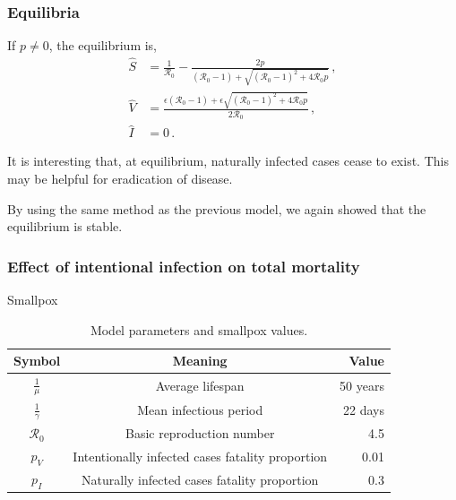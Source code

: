\documentclass[12pt]{beamer}
\newcommand{\R}{\mathcal{R}}
\newcommand{\pmV}{p_{V}}
\newcommand{\pmI}{p_{I}}
\begin{document}
\begin{frame}
\frametitle{Equilibria}

If $p\neq 0$, the equilibrium is,
\begin{subequations}
\begin{align}
\hat{S}&= \frac{1}{\R_0}-\frac{2p}{(\R_0 -1)+ \sqrt{(\R_0-1)^2+4\R_0
         p}}\,, \label{eq:Shat}\\
\hat{V}&= \frac{\epsilon(\R_0 -1)+ \epsilon \sqrt{(\R_0-1)^2+4\R_0 p}}{2\R_0}\,, \label{eq:Vhat}\\
\hat{I}&=0\,. \label{eq:Ihat}
\end{align}
\end{subequations}

It is interesting that, at equilibrium, naturally infected cases cease to exist. This may be helpful for eradication of disease.
\end{frame}
\begin{frame}
By using the same method as the previous model, we again showed that the equilibrium is stable. 
\end{frame}
\begin{frame}
\frametitle{Effect of intentional infection on total mortality}
\begin{center}
Smallpox
\end{center}
\begin{table}[H]\label{tab:params}
\begin{center}
\caption{Model parameters and smallpox values.}
\smallskip
\begin{tabular}{c|c|r}
{\bfseries Symbol} & {\bfseries Meaning} & {\bfseries Value} \\\hline
$\frac{1}{\mu}$ & Average lifespan & 50 years \\
$\frac{1}{\gamma}$ & Mean infectious period & 22 days \\
$\R_0$ & Basic reproduction number & 4.5\\
$\pmV$ & Intentionally infected cases fatality proportion & 0.01\\
$\pmI$ & Naturally infected cases fatality proportion & 0.3
\end{tabular}
\end{center}
\end{table}
\end{frame}
\end{document}
